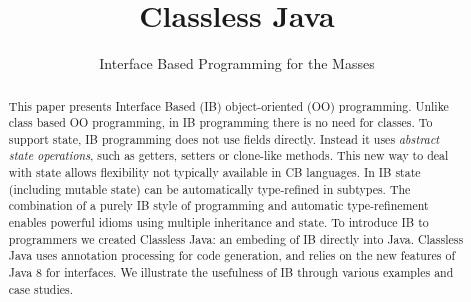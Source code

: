 \documentclass[10pt,preprint,nocopyrightspace,numbers]{sigplanconf}
\begin{document}
\setlength{\pdfpageheight}{\paperheight}
\setlength{\pdfpagewidth}{\paperwidth}




\title{Classless Java}
\subtitle{Interface Based Programming for the Masses}

\authorinfo{}
           {}
           {}

\maketitle

\begin{abstract}

  This paper presents Interface Based (IB) object-oriented (OO)
  programming. Unlike class based OO programming, in IB programming there
  is no need for classes. To support state, IB programming does not
  use fields directly. Instead it uses \emph{abstract state
    operations}, such as getters, setters or clone-like methods. This
  new way to deal with state allows flexibility not typically
  available in CB languages.  In IB state (including mutable state)
  can be automatically type-refined in subtypes. The combination of a
  purely IB style of programming and automatic type-refinement enables
  powerful idioms using multiple inheritance and state.  To introduce
  IB to programmers we created Classless Java: an embeding of IB
  directly into Java. Classless Java uses annotation processing for
  code generation, and relies on the new features of Java 8 for
  interfaces. We illustrate the usefulness of IB through various
  examples and case studies.


\end{abstract}

\begin{comment}
\category{CR-number}{subcategory}{third-level}

\terms
term1, term2

\keywords
keyword1, keyword2
\end{comment}
\end{document}
